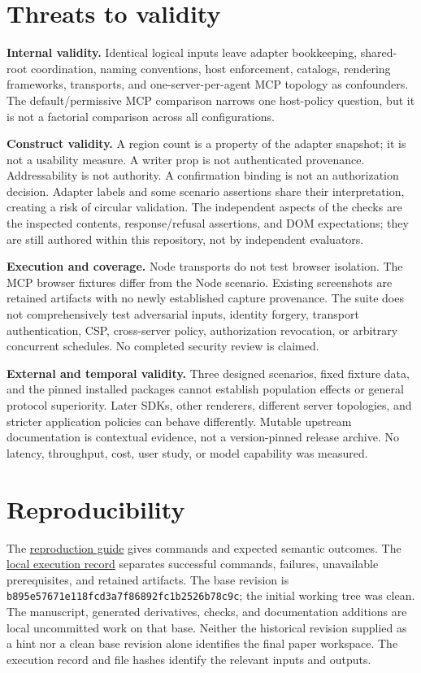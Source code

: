 \documentclass[11pt]{article}
\begin{document}
\section{Threats to validity}\label{threats-to-validity}

\textbf{Internal validity.} Identical logical inputs leave adapter
bookkeeping, shared-root coordination, naming conventions, host
enforcement, catalogs, rendering frameworks, transports, and
one-server-per-agent MCP topology as confounders. The default/permissive
MCP comparison narrows one host-policy question, but it is not a
factorial comparison across all configurations.

\textbf{Construct validity.} A region count is a property of the adapter
snapshot; it is not a usability measure. A writer prop is not
authenticated provenance. Addressability is not authority. A
confirmation binding is not an authorization decision. Adapter labels
and some scenario assertions share their interpretation, creating a risk
of circular validation. The independent aspects of the checks are the
inspected contents, response/refusal assertions, and DOM expectations;
they are still authored within this repository, not by independent
evaluators.

\textbf{Execution and coverage.} Node transports do not test browser
isolation. The MCP browser fixtures differ from the Node scenario.
Existing screenshots are retained artifacts with no newly established
capture provenance. The suite does not comprehensively test adversarial
inputs, identity forgery, transport authentication, CSP, cross-server
policy, authorization revocation, or arbitrary concurrent schedules. No
completed security review is claimed.

\textbf{External and temporal validity.} Three designed scenarios, fixed
fixture data, and the pinned installed packages cannot establish
population effects or general protocol superiority. Later SDKs, other
renderers, different server topologies, and stricter application
policies can behave differently. Mutable upstream documentation is
contextual evidence, not a version-pinned release archive. No latency,
throughput, cost, user study, or model capability was measured.

\section{Reproducibility}\label{reproducibility}

The \href{./REPRODUCTION.md}{reproduction guide} gives commands and
expected semantic outcomes. The \href{./EXECUTION.md}{local execution
record} separates successful commands, failures, unavailable
prerequisites, and retained artifacts. The base revision is
\texttt{b895e57671e118fcd3a7f86892fc1b2526b78c9c}; the initial working
tree was clean. The manuscript, generated derivatives, checks, and
documentation additions are local uncommitted work on that base. Neither
the historical revision supplied as a hint nor a clean base revision
alone identifies the final paper workspace. The execution record and
file hashes identify the relevant inputs and outputs.
\end{document}
